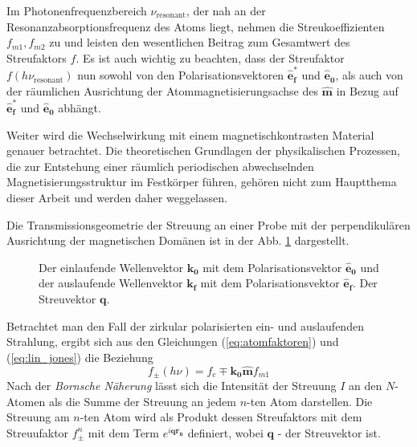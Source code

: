 \noindent
Im Photonenfrequenzbereich $\nu_\text{resonant}$, der nah an der Resonanzabsorptionsfrequenz des Atoms liegt, nehmen die Streukoeffizienten $f_{m1}, f_{m2}$ zu und leisten den wesentlichen Beitrag zum Gesamtwert des Streufaktors $f$. Es ist auch wichtig zu beachten, dass der Streufaktor $f(h\nu_\text{resonant})$ nun sowohl von den Polarisationsvektoren $\mathbf{\hat{e}_f^*}$ und $\mathbf{\hat{e}_0}$, als auch von der räumlichen Ausrichtung der Atommagnetisierungsachse des  $\mathbf{\hat{m}}$ in Bezug auf $\mathbf{\hat{e}_f^*}$ und $\mathbf{\hat{e}_0}$ abhängt.


\noindent
Weiter wird die Wechselwirkung mit einem magnetischkontrasten Material genauer betrachtet. Die theoretischen Grundlagen der physikalischen Prozessen, die zur Entstehung einer räumlich periodischen abwechselnden Magnetisierungsstruktur im Festkörper führen, gehören nicht zum Hauptthema dieser Arbeit und werden daher weggelassen.  

\noindent
Die Transmissionsgeometrie der Streuung an einer Probe mit der perpendikulären Ausrichtung der magnetischen Domänen ist in der Abb. \ref{fig:transmission_geometrie} dargestellt.
\begin{figure}[ht]
    \centering
    
    \caption{Der einlaufende Wellenvektor $\mathbf{k_0}$ mit dem Polarisationsvektor $\mathbf{\hat{e}_0}$ und der auslaufende Wellenvektor $\mathbf{k_f}$ mit dem Polarisationsvektor $\mathbf{\hat{e}_f}$. Der Streuvektor $\mathbf{q}$.}
    \label{fig:transmission_geometrie}
\end{figure}

\noindent
Betrachtet man den Fall der zirkular polarisierten ein- und auslaufenden Strahlung, ergibt sich aus den Gleichungen (\ref{eq:atomfaktoren}) und (\ref{eq:lin_jones}) die Beziehung
\begin{equation}
    f_{\pm}(h\nu)=f_{c}\mp \mathbf{k_0}\mathbf{\hat{m}} f_{m1}
    \label{eq:faktor_zirc}
\end{equation}
Nach der \emph{Bornsche Näherung} lässt sich die Intensität der Streuung $I$ an den $N$-Atomen als die Summe der Streuung an jedem $n$-ten Atom darstellen. Die Streuung am $n$-ten Atom wird  als Produkt dessen Streufaktors mit dem Streuufaktor $f_{\pm}^n$ mit dem Term $e^{i\mathbf{qr_n}}$ definiert, wobei $\mathbf{q}$ - der Streuvektor ist.

